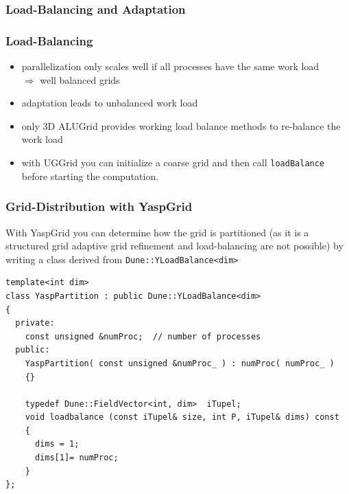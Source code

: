 \subsubsection{Load-Balancing and Adaptation}
\begin{frame}[fragile]
  \frametitle<presentation>{Load-Balancing}
  \begin{itemize}
  \item parallelization only scales well if all processes have the
    same work load\\
    $\Rightarrow$ well balanced grids
  \item adaptation leads to unbalanced work load
  \item only 3D ALUGrid provides working load balance methods to re-balance the work load
   \item with UGGrid you can initialize a coarse grid and then call \lstinline!loadBalance! before starting the
         computation.
  \end{itemize}
\end{frame}

\begin{frame}[fragile]
  \frametitle{Grid-Distribution with YaspGrid}
With YaspGrid you can determine how the grid is partitioned (as it is a structured grid
adaptive grid refinement and load-balancing are not possible) by writing a class derived from
\lstinline!Dune::YLoadBalance<dim>!

\begin{lstlisting}
template<int dim>
class YaspPartition : public Dune::YLoadBalance<dim>
{
  private:
    const unsigned &numProc;  // number of processes
  public:
    YaspPartition( const unsigned &numProc_ ) : numProc( numProc_ )
    {}

    typedef Dune::FieldVector<int, dim>  iTupel;
    void loadbalance (const iTupel& size, int P, iTupel& dims) const
    {
      dims = 1;
      dims[1]= numProc;
    }
};
\end{lstlisting}
\end{frame}

